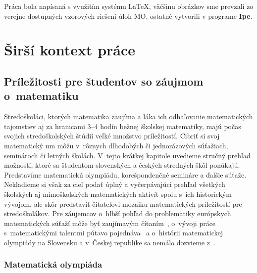 Práca bola napísaná s využitím systému \LaTeX, väčšinu obrázkov sme prevzali zo verejne dostupných vzorových riešení úloh MO, ostatné vytvorili v programe \textbf{Ipe}.


\cleardoublepage

\renewcommand{\chaptermark}[1]{\markboth{\thechapter. #1}{}}
\renewcommand{\sectionmark}[1]{\markright{\thesection. #1}{}}
\HlavickaKapitoly
\chapter{Širší kontext práce}
\section{Príležitosti pre študentov so záujmom o~matematiku}

Stredoškoláci, ktorých matematika zaujíma a láka ich odhaľovanie matematických tajomstiev aj za hranicami 3--4 hodín bežnej školskej matematiky, majú počas svojich stredoškolských štúdií veľké množstvo príležitostí. Cibriť si svoj matematický um môžu v~rôznych dlhodobých či jednorázových súťažiach, seminároch či letných školách. V~tejto krátkej kapitole uvedieme stručný prehľad možností, ktoré sa študentom slovenských a českých stredných škôl ponúkajú. Predstavíme matematickú olympiádu, korešpondenčné semináre a ďalšie súťaže. Nekladieme si však za cieľ podať úplný a vyčerpávajúci prehľad všetkých školských aj mimoškolských matematických aktivít spolu s~ich historickým vývojom, ale skôr predstaviť čitateľovi mozaiku matematických príležitostí pre stredoškolákov. Pre záujemcov o~hlbší pohľad do problematiky európskych matematických súťaží môže byť zaujímavým čítaním~\cite{huv},  o~vývoji práce s~matematickými talentmi pútavo pojednáva~\cite{svrcek2014} a o~histórii matematickej olympiády na Slovensku a v~Českej republike sa nemálo dozvieme z~\cite{dos}.


\subsection*{Matematická olympiáda}


